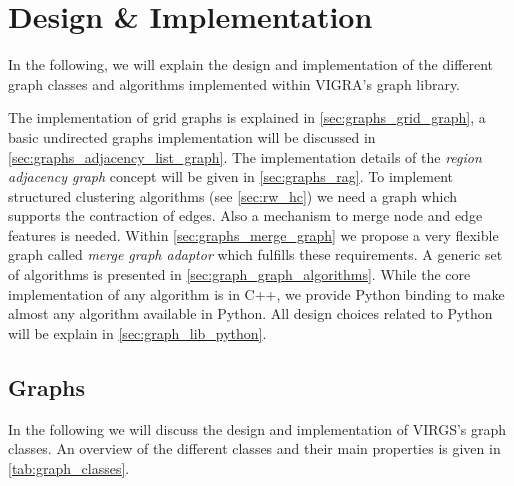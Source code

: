 

\section{Design \& Implementation}\label{sec:vigra_graph_lib_impl}


In the following, we will explain the design and 
implementation of the different graph classes and algorithms
implemented within VIGRA's graph library.


The implementation of grid graphs is explained in \cref{sec:graphs_grid_graph}, 
a basic undirected graphs implementation will be discussed in \cref{sec:graphs_adjacency_list_graph}.
The implementation details of the \emph{region adjacency graph} concept will 
be given in  \cref{sec:graphs_rag}.
To implement structured clustering algorithms (see \cref{sec:rw_hc}) we
need a graph which supports the contraction of edges.
Also a mechanism to merge node and edge features is needed.
Within \cref{sec:graphs_merge_graph} we propose  a very flexible graph 
called \emph{merge graph adaptor} which fulfills these requirements.
A generic set of algorithms  is presented 
in \cref{sec:graph_graph_algorithms}.
While the core implementation of any algorithm is in C++,
we provide Python binding to make almost
any algorithm available in Python.
All design choices related to Python will be explain in \cref{sec:graph_lib_python}.





\subsection{Graphs} \label{sec:impl_graphs}

In the following we will discuss the design and implementation
of VIRGS's graph classes.
An overview of the different classes and their main properties
is given in \cref{tab:graph_classes}.

